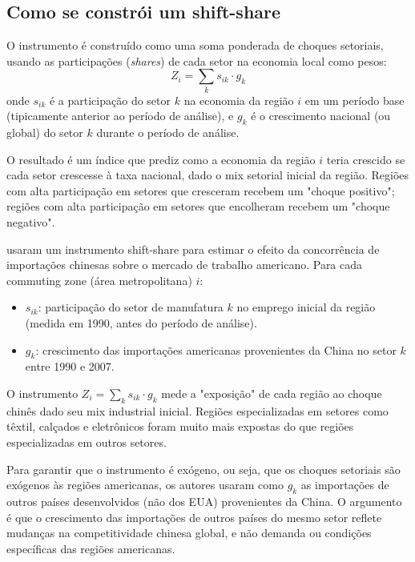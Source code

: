 \subsection*{Como se constrói um shift-share}

O instrumento é construído como uma soma ponderada de choques setoriais, usando as participações (\textit{shares}) de cada setor na economia local como pesos:
\begin{equation}
Z_i = \sum_{k} s_{ik} \cdot g_k
\label{eq:shiftshare}
\end{equation}
onde $s_{ik}$ é a participação do setor $k$ na economia da região $i$ em um período base (tipicamente anterior ao período de análise), e $g_k$ é o crescimento nacional (ou global) do setor $k$ durante o período de análise.

O resultado é um índice que prediz como a economia da região $i$ teria crescido se cada setor crescesse à taxa nacional, dado o mix setorial inicial da região. Regiões com alta participação em setores que cresceram recebem um "choque positivo"; regiões com alta participação em setores que encolheram recebem um "choque negativo".

\begin{exemplobox}
\citet{AutorDornHanson2013} usaram um instrumento shift-share para estimar o efeito da concorrência de importações chinesas sobre o mercado de trabalho americano. Para cada commuting zone (área metropolitana) $i$:

\begin{itemize}[leftmargin=*]
  \item $s_{ik}$: participação do setor de manufatura $k$ no emprego inicial da região (medida em 1990, antes do período de análise).
  \item $g_k$: crescimento das importações americanas provenientes da China no setor $k$ entre 1990 e 2007.
\end{itemize}

O instrumento $Z_i = \sum_k s_{ik} \cdot g_k$ mede a "exposição" de cada região ao choque chinês dado seu mix industrial inicial. Regiões especializadas em setores como têxtil, calçados e eletrônicos foram muito mais expostas do que regiões especializadas em outros setores.

Para garantir que o instrumento é exógeno, ou seja, que os choques setoriais são exógenos às regiões americanas, os autores usaram como $g_k$ as importações de outros países desenvolvidos (não dos EUA) provenientes da China. O argumento é que o crescimento das importações de outros países do mesmo setor reflete mudanças na competitividade chinesa global, e não demanda ou condições específicas das regiões americanas.
\end{exemplobox}

